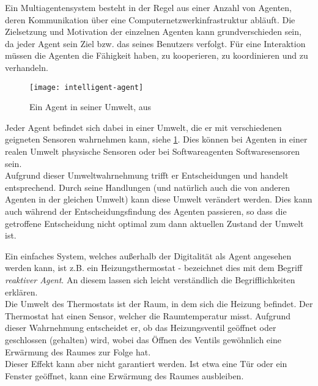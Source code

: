 Ein Multiagentensystem besteht in der Regel aus einer Anzahl von Agenten, deren Kommunikation über eine Computernetzwerkinfrastruktur abläuft.
Die Zielsetzung und Motivation der einzelnen Agenten kann grundverschieden sein, da jeder Agent sein Ziel bzw. das seines Benutzers verfolgt.
Für eine Interaktion müssen die Agenten die Fähigkeit haben, zu kooperieren, zu koordinieren und zu verhandeln.

\begin{figure}[hptb]
 \centering
 \texttt{[image: intelligent-agent]}
 \caption[Ein Agent in seiner Umwelt]
 		{Ein Agent in seiner Umwelt, aus \cite{multiagent}}
 \label{figure:intelligent-agent}
\end{figure}
\noindent
Jeder Agent befindet sich dabei in einer Umwelt, die er mit verschiedenen geigneten Sensoren wahrnehmen kann, siehe \cref{figure:intelligent-agent}.
Dies können bei Agenten in einer realen Umwelt phsysische Sensoren oder bei Softwareagenten Softwaresensoren sein.
\\
Aufgrund dieser Umweltwahrnehmung trifft er Entscheidungen und handelt entsprechend.
Durch seine Handlungen (und natürlich auch die von anderen Agenten in der gleichen Umwelt) kann diese Umwelt verändert werden.
Dies kann auch während der Entscheidungsfindung des Agenten passieren, so dass die getroffene Entscheidung nicht optimal zum dann aktuellen Zustand der Umwelt ist.

Ein einfaches System, welches außerhalb der Digitalität als Agent angesehen werden kann, ist z.B. ein Heizungsthermostat - \cite{artificialintelligence} bezeichnet dies mit dem Begriff \textit{reaktiver Agent}.
An diesem lassen sich leicht verständlich die Begrifflichkeiten erklären.
\\
Die Umwelt des Thermostats ist der Raum, in dem sich die Heizung befindet.
Der Thermostat hat einen Sensor, welcher die Raumtemperatur misst.
Aufgrund dieser Wahrnehmung entscheidet er, ob das Heizungsventil geöffnet oder geschlossen (gehalten) wird, wobei das Öffnen des Ventils gewöhnlich eine Erwärmung des Raumes zur Folge hat.
\\
Dieser Effekt kann aber nicht garantiert werden.
Ist etwa eine Tür oder ein Fenster geöffnet, kann eine Erwärmung des Raumes ausbleiben.

